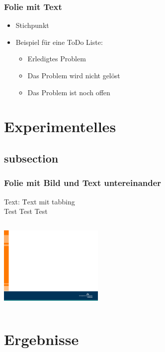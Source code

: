 \begin{frame}
	\frametitle{Folie mit Text}
	\vskip5mm
	\vspace{-0.4cm}%
	\begin{itemize}
		\itemsep1.2em
		\item Stichpunkt
		\item Beispiel für eine ToDo Liste:
		\begin{itemize}
			\itemsep1.2em
			\item[\done] Erledigtes Problem
			\item[\wontfix] Das Problem wird nicht gelöst
			\item[\open] Das Problem ist noch offen
		\end{itemize}
	\end{itemize}
\end{frame}

\section{Experimentelles}
\subsection{subsection}
\begin{frame}
\frametitle{Folie mit Bild und Text untereinander}
\begin{tabbing}
	Text: \qquad \= Text mit tabbing\\
	\> Test Test Test\\
\end{tabbing}
	\vskip5mm
	\begin{columns}
		\column{12cm}
		\centering
		\includegraphics[width=5.0cm]{style/images/master_background}\\
	\end{columns}
\end{frame}

\section{Ergebnisse}
